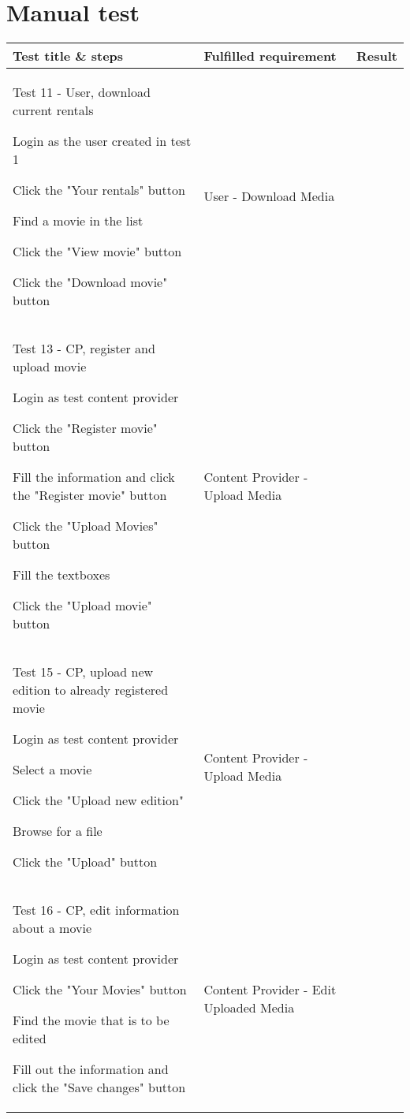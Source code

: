 \section{Manual test}
\label{Appendix_Test_Manual}

\begin{centering}
\begin{longtable}{| p{5 cm} | p{7 cm} | c |}
\hline
Test title \& steps & Fulfilled requirement & Result\\
\hline
Test 11 - User, download current rentals
\begin{my_enumerate}
\item Login as the user created in test 1
\item Click the "Your rentals" button
\item Find a movie in the list
\item Click the "View movie" button
\item Click the "Download movie" button\end{my_enumerate}& User - Download Media &  \\

\hline
Test 13 - CP, register and upload movie
\begin{my_enumerate}
\item Login as test content provider
\item Click the "Register movie" button
\item Fill the information and click the "Register movie" button
\item Click the "Upload Movies" button
\item Fill the textboxes
\item Click the "Upload movie" button\end{my_enumerate} & Content Provider - Upload Media &  \\

\hline
Test 15 - CP, upload new edition to already registered movie
\begin{my_enumerate}
\item Login as test content provider
\item Select a movie
\item Click the "Upload new edition"
\item Browse for a file
\item Click the "Upload" button\end{my_enumerate}  & Content Provider - Upload Media &  \\

\hline
Test 16 - CP, edit information about a movie
\begin{my_enumerate}
\item Login as test content provider
\item Click the "Your Movies" button
\item Find the movie that is to be edited
\item Fill out the information and click the "Save changes" button\end{my_enumerate} & Content Provider - Edit Uploaded Media &  \\


\end{longtable}
\end{centering}
